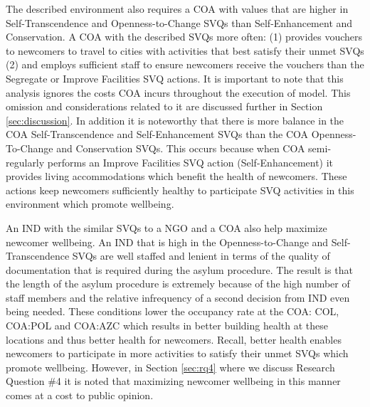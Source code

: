 \documentclass{scspaperproc}
\theoremstyle{scsthe}
\begin{document}
The described environment also requires a COA with values that are higher in Self-Transcendence and Openness-to-Change SVQs than Self-Enhancement and Conservation. A COA with the described SVQs more often: (1) provides vouchers to newcomers to travel to cities with activities that best satisfy their unmet SVQs (2) and employs sufficient staff to ensure newcomers receive the vouchers than the Segregate or Improve Facilities SVQ actions. It is important to note that this analysis ignores the costs COA incurs throughout the execution of model. This omission and considerations related to it are discussed further in Section \ref{sec:discussion}. In addition it is noteworthy that there is more balance in the COA Self-Transcendence and Self-Enhancement SVQs than the COA Openness-To-Change and Conservation SVQs. This occurs because when COA semi-regularly performs an Improve Facilities SVQ action (Self-Enhancement) it provides living accommodations which benefit the health of newcomers. These actions keep newcomers sufficiently healthy to participate SVQ activities in this environment which promote wellbeing.  

An IND with the similar SVQs to a NGO and a COA also help maximize newcomer wellbeing. An IND that is high in the Openness-to-Change and Self-Transcendence SVQs are well staffed and lenient in terms of the quality of documentation that is required during the asylum procedure. The result is that the length of the asylum procedure is extremely because of the high number of staff members and the relative infrequency of a second decision from IND even being needed. These conditions lower the occupancy rate at the COA: COL, COA:POL and COA:AZC which results in better building health at these locations and thus better health for newcomers. Recall, better health enables newcomers to participate in more activities to satisfy their unmet SVQs which promote wellbeing. However, in Section \ref{sec:rq4} where we discuss Research Question \#4 it is noted that maximizing newcomer wellbeing in this manner comes at a cost to public opinion. 
\end{document}
